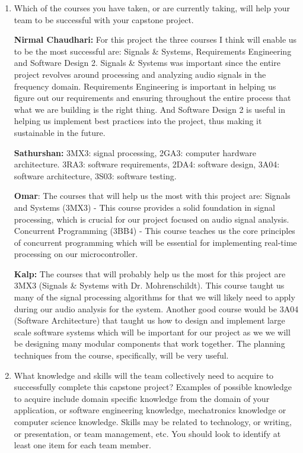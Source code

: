 \begin{enumerate}
  
  \item Which of the courses you have taken, or are currently taking, will help
  your team to be successful with your capstone project.

  \textbf{Nirmal Chaudhari: } For this project the three courses I think will 
  enable us to be the most successful are: Signals \& Systems, Requirements 
  Engineering and Software Design 2. Signals \& Systems was important since the 
  entire project revolves around processing and analyzing audio signals in the 
  frequency domain. Requirements Engineering is important in helping us figure 
  out our requirements and ensuring throughout the entire process that what we 
  are building is the right thing. And Software Design 2 is useful in helping 
  us implement best practices into the project, thus making it sustainable 
  in the future.

  \textbf{Sathurshan:} 3MX3: signal processing, 2GA3: computer hardware
  architecture. 3RA3: software requirements, 2DA4: software design,
  3A04: software architecture, 3S03: software testing.

  \textbf{Omar}: The courses that will help us the most with this project are:
  Signals and Systems (3MX3) - This course provides a solid foundation in signal
  processing, which is crucial for our project focused on audio signal analysis.
  Concurrent Programming (3BB4) - This course teaches us the core principles
  of concurrent programming which will be essential for implementing real-time
  processing on our microcontroller.

  \textbf{Kalp:} The courses that will probably help us the most for this 
  project are 3MX3 (Signals & Systems with Dr. Mohrenschildt). This course
  taught us many of the signal processing algorithms for that we will likely 
  need to apply during our audio analysis for the system. Another good course 
  would be 3A04 (Software Architecture) that taught us how to design and 
  implement large scale software systems which will be important for our project
  as we we will be designing many modular components that work together. The 
  planning techniques from the course, specifically, will be very useful.

  \item What knowledge and skills will the team collectively need to acquire to
  successfully complete this capstone project?  Examples of possible knowledge
  to acquire include domain specific knowledge from the domain of your
  application, or software engineering knowledge, mechatronics knowledge or
  computer science knowledge.  Skills may be related to technology, or writing,
  or presentation, or team management, etc.  You should look to identify at
  least one item for each team member.


\end{enumerate}

